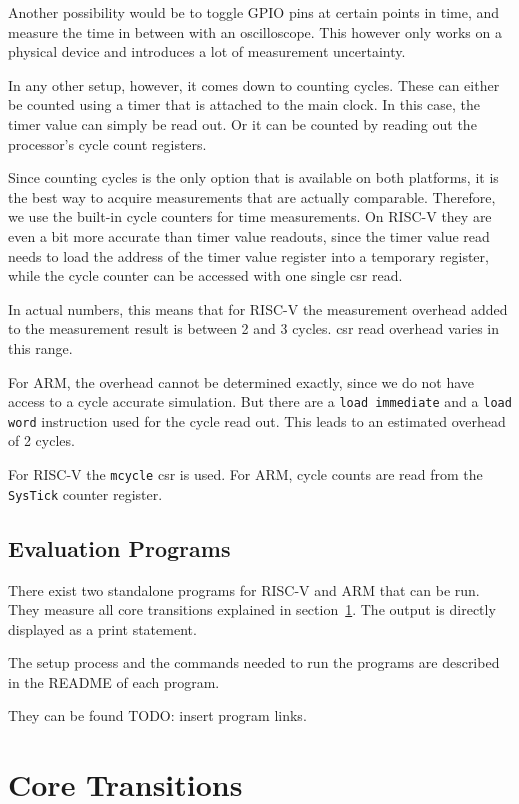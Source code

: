 Another possibility would be to toggle GPIO pins at certain points in time, and measure the time in between with an oscilloscope. This however only works on a physical device and introduces a lot of measurement uncertainty.

In any other setup, however, it comes down to counting cycles. These can either be counted using a timer that is attached to the main clock. In this case, the timer value can simply be read out. Or it can be counted by reading out the processor's cycle count registers. 

Since counting cycles is the only option that is available on both platforms, it is the best way to acquire measurements that are actually comparable. Therefore, we use the built-in cycle counters for time measurements. On RISC-V they are even a bit more accurate than timer value readouts, since the timer value read needs to load the address of the timer value register into a temporary register, while the cycle counter can be accessed with one single \gls{csr} read.

In actual numbers, this means that for RISC-V the measurement overhead added to the measurement result is between 2 and 3 cycles. \gls{csr} read overhead varies in this range.

For ARM, the overhead cannot be determined exactly, since we do not have access to a cycle accurate simulation. But there are a \texttt{load immediate} and a \texttt{load word} instruction used for the cycle read out. This leads to an estimated overhead of 2 cycles.

For RISC-V the \texttt{mcycle} \gls{csr} is used. For ARM, cycle counts are read from the \texttt{SysTick} counter register.

\subsection{Evaluation Programs}
There exist two standalone programs for RISC-V and ARM that can be run. They measure all core transitions explained in section~\ref{sec:core_transitions}. The output is directly displayed as a print statement.

The setup process and the commands needed to run the programs are described in the README of each program. 

They can be found TODO: insert program links.


\section{Core Transitions}
\label{sec:core_transitions}

